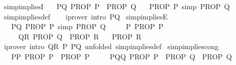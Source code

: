 \begin{isabellebody}
\isanewline
{}\isamarkupfalse%
\ simp{\isacharunderscore}{\kern0pt}impliesI{\isacharcolon}{\kern0pt}\isanewline
\ \ \ PQ{\isacharcolon}{\kern0pt}\ {\isachardoublequoteopen}{\isacharparenleft}{\kern0pt}PROP\ P\ {\isasymLongrightarrow}\ PROP\ Q{\isacharparenright}{\kern0pt}{\isachardoublequoteclose}\isanewline
\ \ \ {\isachardoublequoteopen}PROP\ P\ {\isacharequal}{\kern0pt}simp{\isacharequal}{\kern0pt}{\isachargreater}{\kern0pt}\ PROP\ Q{\isachardoublequoteclose}\isanewline
%
\isadelimproof
\ \ %
\endisadelimproof
%
\isatagproof
{}\isamarkupfalse%
\ simp{\isacharunderscore}{\kern0pt}implies{\isacharunderscore}{\kern0pt}def\isanewline
\ \ \isamarkupfalse%
\ {\isacharparenleft}{\kern0pt}iprover\ intro{\isacharcolon}{\kern0pt}\ PQ{\isacharparenright}{\kern0pt}%
\endisatagproof
{\isafoldproof}%
%
\isadelimproof
\isanewline
%
\endisadelimproof
\isanewline
{}\isamarkupfalse%
\ simp{\isacharunderscore}{\kern0pt}impliesE{\isacharcolon}{\kern0pt}\isanewline
\ \ \ PQ{\isacharcolon}{\kern0pt}\ {\isachardoublequoteopen}PROP\ P\ {\isacharequal}{\kern0pt}simp{\isacharequal}{\kern0pt}{\isachargreater}{\kern0pt}\ PROP\ Q{\isachardoublequoteclose}\isanewline
\ \ \ \ \ P{\isacharcolon}{\kern0pt}\ {\isachardoublequoteopen}PROP\ P{\isachardoublequoteclose}\isanewline
\ \ \ \ \ QR{\isacharcolon}{\kern0pt}\ {\isachardoublequoteopen}PROP\ Q\ {\isasymLongrightarrow}\ PROP\ R{\isachardoublequoteclose}\isanewline
\ \ \ {\isachardoublequoteopen}PROP\ R{\isachardoublequoteclose}\isanewline
%
\isadelimproof
\ \ %
\endisadelimproof
%
\isatagproof
{}\isamarkupfalse%
\ {\isacharparenleft}{\kern0pt}iprover\ intro{\isacharcolon}{\kern0pt}\ QR\ P\ PQ\ {\isacharbrackleft}{\kern0pt}unfolded\ simp{\isacharunderscore}{\kern0pt}implies{\isacharunderscore}{\kern0pt}def{\isacharbrackright}{\kern0pt}{\isacharparenright}{\kern0pt}%
\endisatagproof
{\isafoldproof}%
%
\isadelimproof
\isanewline
%
\endisadelimproof
\isanewline
{}\isamarkupfalse%
\ simp{\isacharunderscore}{\kern0pt}implies{\isacharunderscore}{\kern0pt}cong{\isacharcolon}{\kern0pt}\isanewline
\ \ \ PP{\isacharprime}{\kern0pt}\ {\isacharcolon}{\kern0pt}{\isachardoublequoteopen}PROP\ P\ {\isasymequiv}\ PROP\ P{\isacharprime}{\kern0pt}{\isachardoublequoteclose}\isanewline
\ \ \ \ \ P{\isacharprime}{\kern0pt}QQ{\isacharprime}{\kern0pt}{\isacharcolon}{\kern0pt}\ {\isachardoublequoteopen}PROP\ P{\isacharprime}{\kern0pt}\ {\isasymLongrightarrow}\ {\isacharparenleft}{\kern0pt}PROP\ Q\ {\isasymequiv}\ PROP\ Q{\isacharprime}{\kern0pt}{\isacharparenright}{\kern0pt}{\isachardoublequoteclose}\isanewline

\end{isabellebody}
